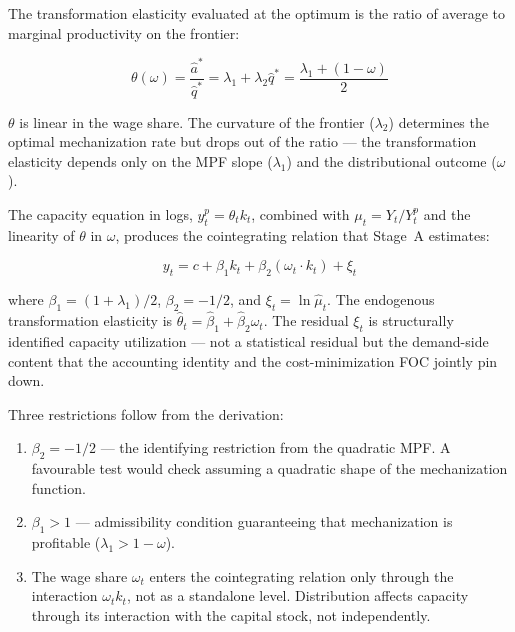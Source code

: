 \documentclass[11pt,a4paper]{article}
\begin{document}
{The transformation elasticity evaluated at the optimum is the ratio
of average to marginal productivity on the frontier:

\begin{equation}
	\boxed{\theta(\omega) = \frac{\hat{a}^*}{\hat{q}^*}
	= \lambda_1 + \lambda_2 \hat{q}^*
	= \frac{\lambda_1 + (1 - \omega)}{2}}
	\label{eq:theta_omega}
\end{equation}

$\theta$ is linear in the wage share. The curvature of the frontier
($\lambda_2$) determines the optimal mechanization rate but drops out
of the ratio --- the transformation elasticity depends only on the
MPF slope ($\lambda_1$) and the distributional outcome ($\omega$).

The capacity equation in logs, $y_t^p = \theta_t k_t$, combined with
$\mu_t = Y_t / Y_t^p$ and the linearity of $\theta$ in $\omega$,
produces the cointegrating relation that Stage~A estimates:

\begin{equation}
	y_t = c + \beta_1 k_t + \beta_2 (\omega_t \cdot k_t) + \xi_t
	\label{eq:coint}
\end{equation}

where $\beta_1 = (1+\lambda_1)/2$, $\beta_2 = -1/2$, and
$\xi_t = \ln \hat{\mu}_t$. The endogenous transformation elasticity
is $\hat{\theta}_t = \hat{\beta}_1 + \hat{\beta}_2 \omega_t$. The
residual $\xi_t$ is structurally identified capacity utilization ---
not a statistical residual but the demand-side content that the
accounting identity and the cost-minimization FOC jointly pin down.

Three restrictions follow from the derivation:

\begin{enumerate}
	\item[\textbf{R1.}] $\beta_2 = -1/2$ --- the identifying restriction
	from the quadratic MPF. A favourable test would check assuming a 
	quadratic shape of the mechanization function. 
	\item[\textbf{R2.}] $\beta_1 > 1$ --- admissibility condition
	guaranteeing that mechanization is profitable
	($\lambda_1 > 1 - \omega$).
	\item[\textbf{R3.}] The wage share $\omega_t$ enters the
	cointegrating relation only through the interaction
	$\omega_t k_t$, not as a standalone level. Distribution
	affects capacity through its interaction with the capital
	stock, not independently.
\end{enumerate}

}
\end{document}
